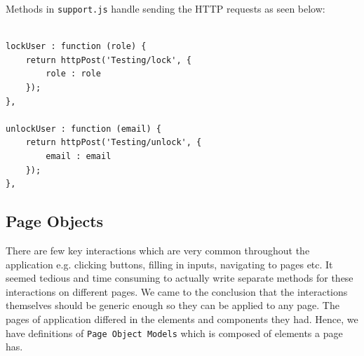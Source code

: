 Methods in \texttt{support.js} handle sending the HTTP requests as seen below:

\begin{listing}[H]
\begin{verbatim}

lockUser : function (role) {
	return httpPost('Testing/lock', {
		role : role
	});
},

unlockUser : function (email) {
	return httpPost('Testing/unlock', {
		email : email
	});
},

\end{verbatim}
\label{lst:login-and-logout-hooks}
\end{listing}

\subsection{Page Objects}
\label{subsec:page-objects}
There are few key interactions which are very common throughout the application e.g. clicking buttons, filling in inputs, navigating to pages etc. It seemed tedious and time consuming to actually write separate methods for these interactions on different pages. We came to the conclusion that the interactions themselves should be generic enough so they can be applied to any page. The pages of application differed in the elements and components they had. Hence, we have definitions of \texttt{Page Object Models} which is composed of elements a page has.

